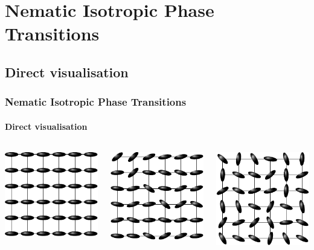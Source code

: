 \documentclass{beamer}
\begin{document}
\section{Nematic Isotropic Phase Transitions}
\subsection{Direct visualisation}
\begin{frame}
	\frametitle{Nematic Isotropic Phase Transitions}
	\framesubtitle{Direct visualisation}

\begin{columns}
    \begin{column}{3cm}
    	\includegraphics[scale=0.8]{figures/00.pdf}
	\end{column}

	\begin{column}{3cm}
    	\includegraphics[scale=0.8]{figures/09.pdf}
	\end{column}
	
	\begin{column}{3cm}
    	\includegraphics[scale=0.8]{figures/15.pdf}
	\end{column}
\end{columns}


\end{frame}
\end{document}
